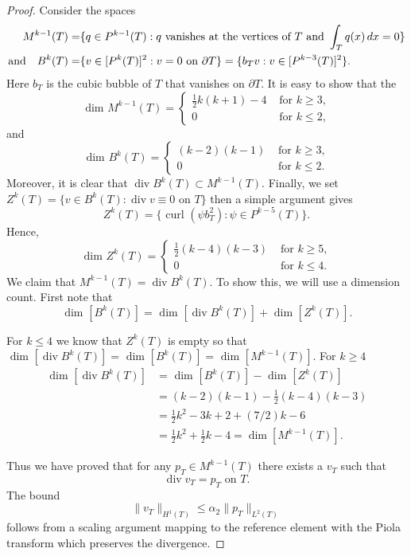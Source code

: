 \documentclass[11pt]{amsart}
\numberwithin{equation}{section}
\newcommand{\dive}{\operatorname{div}}
\theoremstyle{definition}
\begin{document}
\begin{proof}
Consider the spaces
\begin{alignat*}{1}
M^{k-1}(T)= & \{q\in P^{k-1}(T):  q \text{ vanishes at the vertices of } T \text{ and }  \int_T q(x)\,dx=0 \} \\
\hbox{and}\quad B^k(T)=&\{v \in [P^k(T)]^2: v=0 \text{ on }  \partial T\} =\{b_T v: v \in  [P^{k-3}(T)]^2\}.
\end{alignat*}
Here $b_T$ is the cubic bubble of $T$ that vanishes on $\partial T$. 
It is easy to show that the 
\[
\text{ dim } M^{k-1}(T) {=}
\begin{cases}
\frac{1}{2}k(k+1) - 4 &  \text{ for } k \ge 3, \\
 0  & \text{ for } k \le 2,
\end{cases}
\]
and
 \[
\text{ dim } B^{k}(T) {=}
\begin{cases}
(k-2)(k-1)&  \text{ for } k \ge 3, \\
 0  & \text{ for } k \le 2.
\end{cases}
\]
Moreover,  it is clear that $\dive B^k(T)\subset M^{k-1}(T)$. Finally, we set 
$Z^{k}(T)=\{ v \in B^k(T): \dive v \equiv 0 \text{ on }  T \} $
then a simple argument gives
\begin{equation*}
Z^{k}(T)= \{\text{ curl } (\psi b_T^2) : \psi  \in P^{k-5}(T) \}.
\end{equation*}
Hence,
 \[
\text{ dim } Z^{k}(T) {=}
\begin{cases}
\frac{1}{2}(k-4)(k-3) &  \text{ for } k \ge 5, \\
 0  & \text{ for } k \le 4.
\end{cases}
\]
We claim that $  M^{k-1}(T) = \dive B^k(T)$. To show this, we will use a dimension count. First note that
\begin{equation*}
\text{ dim } [B^k(T)] = \text{ dim } [\dive B^k(T)] + \text{ dim } [Z^{k}(T)].
\end{equation*}

For $k \le 4$ we know that $ Z^{k}(T)$ is empty so that $\text{ dim } [\dive B^k(T)]= \text{ dim } [B^k(T)] = \text{ dim } [M^{k-1}(T)]$. For $k \ge 4$
\begin{equation*} 
\begin{split}
 \text{ dim } [\dive B^k(T)] &= \text{ dim } [B^k(T)]- \text{ dim } [Z^{k}(T)]\\
&=(k-2)(k-1)-\frac{1}{2}(k-4)(k-3)\\
&=\frac{1}{2} k^2 -3k+2 +(7/2)k-6 \\
&=\frac{1}{2} k^2 +\frac{1}{2} k -4=\dim [M^{k-1}(T)].
\end{split}
\end{equation*}


Thus we have proved that for any $p_T \in M^{k-1}(T)$ there exists a $v_T$ such that  
\begin{equation*}
\dive v_T =p_T \text{ on } T.
\end{equation*}
The bound 
\begin{equation*}
\|v_T\|_{H^1(T)} \le \alpha_2 \|p_T\|_{L^2(T)}
\end{equation*}
 follows from a scaling argument mapping to the reference element  with  the Piola transform which preserves the divergence. 
\end{proof}
\end{document}
